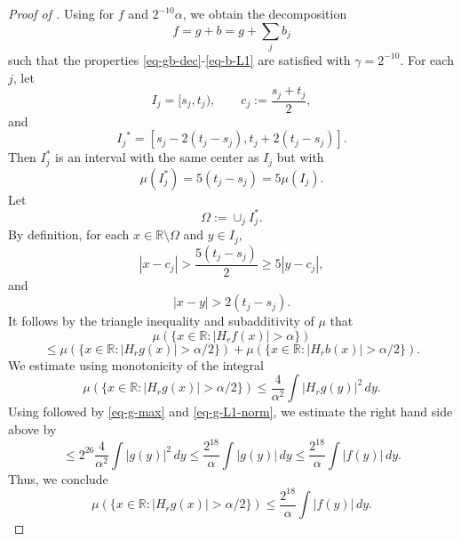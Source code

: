 \begin{proof}[Proof of ]
Using  for $f$ and $2^{-10}\alpha$, we obtain the decomposition
$$f=g+b=g+\sum_j b_j$$
such that the properties \eqref{eq-gb-dec}-\eqref{eq-b-L1} are satisfied with $\gamma=2^{-10}$. For each $j$, let
\begin{equation}
    \label{eq-Ij-cj}
    I_j=[s_j, t_j), \qquad c_j:=\frac{s_j+t_j}{2},
\end{equation}
and
\begin{equation}
    \label{eq-Ij*}
    I_j{^*}=\left[s_j-{2(t_j-s_j)}, t_j+2(t_j-s_j)\right].
\end{equation}
Then $I_j^*$ is an interval with the same center as $I_j$ but with
\begin{equation}
    \label{eq-Ij*-dim}
    \mu(I_j^*)=5(t_j-s_j)=5\mu(I_j).
\end{equation}
Let
\begin{equation}
    \label{eq-omega}
    \Omega:=\cup_j I_{j}^*.
\end{equation}
By definition, for each $x\in \mathbb{R}\setminus\Omega$ and $y\in I_j$,
\begin{equation}
    \label{eq-Om-cj}
    |x-c_j|>\frac{5(t_j-s_j)}{2}\geq 5|y-c_j|,
\end{equation}
and
\begin{equation}
    \label{eq-Om-y}
    |x-y|>{2(t_j-s_j)}.
\end{equation}
It follows by the triangle inequality and subadditivity of $\mu$ that
$$ \mu\left(\{x\in \mathbb{R}: |H_r f(x)|>\alpha\}\right) $$
\begin{equation}
\label{eq-set-dec-1}
 \le \mu\left(\{x\in \mathbb{R}: |H_r g(x)|>{\alpha}/2\}\right)+ \mu\left(\{x\in \mathbb{R}: |H_r b(x)|>{\alpha}/2\}\right).
\end{equation}
We estimate using monotonicity of the integral
$$ \mu\left(\{x\in \mathbb{R}: |H_r g(x)|>{\alpha}/2\}\right)\leq
\frac{4}{\alpha^2} \int |H_r g(y)|^2\, dy. $$
Using  followed by \eqref{eq-g-max} and \eqref{eq-g-L1-norm}, we estimate the right hand side above by
$$\leq 2^{26}\frac{4}{\alpha^2} \int |g(y)|^2\, dy\leq \frac{2^{18}}{\alpha} \int |g(y)|\, dy\leq \frac{2^{18}}{\alpha} \int |f(y)|\, dy.$$
Thus, we conclude
\begin{equation}
    \label{eq-g-func-bd}
    \mu\left(\{x\in \mathbb{R}: |H_r g(x)|>{\alpha}/2\}\right)\leq
    \frac{2^{18}}{\alpha} \int |f(y)|\, dy.
\end{equation}

\end{proof}
